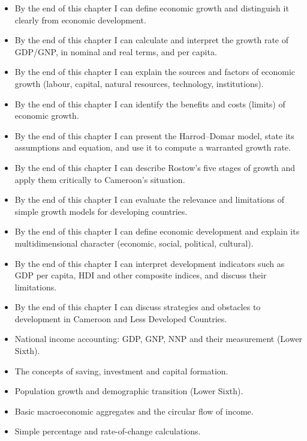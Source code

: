 \documentclass[11pt]{article}
\begin{document}
\begin{objectifs}
\begin{itemize}
\item By the end of this chapter I can define economic growth and distinguish it clearly from economic development.
\item By the end of this chapter I can calculate and interpret the growth rate of GDP/GNP, in nominal and real terms, and per capita.
\item By the end of this chapter I can explain the sources and factors of economic growth (labour, capital, natural resources, technology, institutions).
\item By the end of this chapter I can identify the benefits and costs (limits) of economic growth.
\item By the end of this chapter I can present the Harrod–Domar model, state its assumptions and equation, and use it to compute a warranted growth rate.
\item By the end of this chapter I can describe Rostow's five stages of growth and apply them critically to Cameroon's situation.
\item By the end of this chapter I can evaluate the relevance and limitations of simple growth models for developing countries.
\item By the end of this chapter I can define economic development and explain its multidimensional character (economic, social, political, cultural).
\item By the end of this chapter I can interpret development indicators such as GDP per capita, HDI and other composite indices, and discuss their limitations.
\item By the end of this chapter I can discuss strategies and obstacles to development in Cameroon and Less Developed Countries.
\end{itemize}
\end{objectifs}

\begin{prerequis}
\begin{itemize}
\item National income accounting: GDP, GNP, NNP and their measurement (Lower Sixth).
\item The concepts of saving, investment and capital formation.
\item Population growth and demographic transition (Lower Sixth).
\item Basic macroeconomic aggregates and the circular flow of income.
\item Simple percentage and rate-of-change calculations.
\end{itemize}
\end{prerequis}
\end{document}
